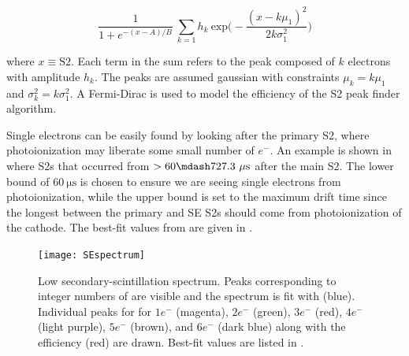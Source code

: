 \begin{equation}
\frac{1}{1 + e^{-(x - A) / B}}\ \sum_{k = 1} h_k\ \mathrm{exp} \bigg( -\frac{(x - k \mu_1)^2}{2 k \sigma_1^2} \bigg)
\label{eq:det_char_single_electron_gain_model}
\end{equation}

\noindent where $x \equiv \mathrm{S2}$.  Each term in the sum refers to the peak composed of $k$ electrons with amplitude $h_k$.  The
peaks are assumed gaussian with constraints $\mu_k = k \mu_1$ and $\sigma_k^2 = k \sigma_1^2$.  A Fermi-Dirac is used to model the
efficiency of the S2 peak finder algorithm.

Single electrons can be easily found by looking after the primary S2, where photoionization may liberate some small number of $e^-$.  An
example is shown in  where S2s that occurred from
$> 60 \mdash 727.3\ \mathrm{\mu s}$ after the main S2.  The lower bound of $60\ \mathrm{\mu s}$ is chosen to
ensure we are seeing single electrons from photoionization, while the upper bound is set to the maximum drift time since the longest
between the primary and SE S2s should come from photoionization of the cathode.  The best-fit values from
 are given in .

\begin{figure}
\centering
\texttt{[image: SEspectrum]}
\caption{Low secondary-scintillation spectrum.  Peaks corresponding to integer numbers of \electron are visible and the spectrum is fit
with  (blue).  Individual peaks for for $1 e^-$ (magenta), $2 e^-$ (green), $3 e^-$ (red),
$4 e^-$ (light purple), $5 e^-$ (brown), and $6 e^-$ (dark blue) along with the efficiency (red) are drawn.  Best-fit values are listed in
.}
\label{fig:calibrations_single_electron_gain_num_photons}
\end{figure}

